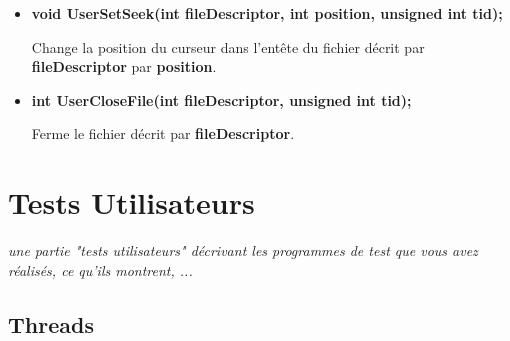 \documentclass{article}
\begin{document}
\begin{itemize}
\begin{itemize}
    \item
    \textbf{void UserSetSeek(int fileDescriptor, int position, unsigned int tid);}

	Change la position du curseur dans l'entête du fichier décrit par \textbf{fileDescriptor} par \textbf{position}.

    \item
    \textbf{int UserCloseFile(int fileDescriptor, unsigned int tid);}

	Ferme le fichier décrit par \textbf{fileDescriptor}.

\end{itemize}

\end{itemize}

\newpage

\newpage
\section{Tests Utilisateurs}
\textit{une partie "tests utilisateurs" décrivant les programmes de test que vous avez réalisés, ce qu'ils montrent, ...}
\vspace{5mm}

\subsection{Threads}
\end{document}
